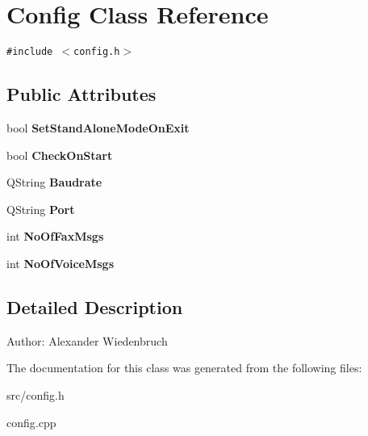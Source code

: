 \section{Config Class Reference}
\label{classConfig}
{\tt \#include $<$config.h$>$}

\subsection*{Public Attributes}
\begin{CompactItemize}
\item 
bool {\bf Set\-Stand\-Alone\-Mode\-On\-Exit}\label{classConfig_o0}

\item 
bool {\bf Check\-On\-Start}\label{classConfig_o1}

\item 
QString {\bf Baudrate}\label{classConfig_o2}

\item 
QString {\bf Port}\label{classConfig_o3}

\item 
int {\bf No\-Of\-Fax\-Msgs}\label{classConfig_o4}

\item 
int {\bf No\-Of\-Voice\-Msgs}\label{classConfig_o5}

\end{CompactItemize}


\subsection{Detailed Description}
\begin{Desc}
\item[Author:]Alexander Wiedenbruch \end{Desc}




The documentation for this class was generated from the following files:\begin{CompactItemize}
\item 
src/config.h\item 
config.cpp\end{CompactItemize}

